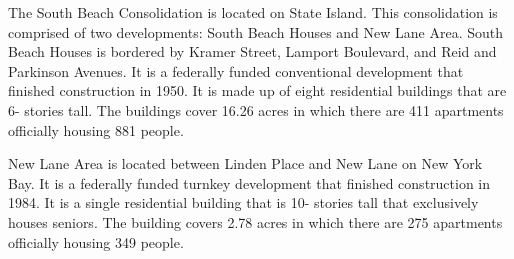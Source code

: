       

    

The South Beach Consolidation is located on State Island. This consolidation is comprised of two developments: South Beach Houses and New Lane Area. South Beach Houses is bordered by Kramer Street, Lamport Boulevard, and Reid and Parkinson Avenues. It is a federally funded conventional development that finished construction in 1950. It is made up of eight residential buildings that are 6- stories tall. The buildings cover 16.26 acres in which there are 411 apartments officially housing 881 people.  

New Lane Area is located between Linden Place and New Lane on New York Bay. It is a federally funded turnkey development that finished construction in 1984. It is a single residential building that is 10- stories tall that exclusively houses seniors. The building covers 2.78 acres in which there are 275 apartments officially housing 349 people.  